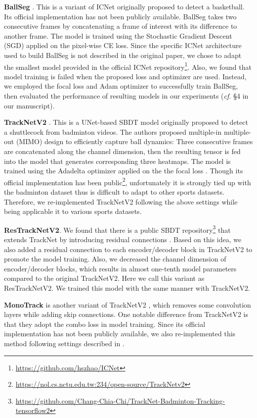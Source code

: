 \documentclass{bmvc2k}
\begin{document}
\vspace{1mm}
\noindent \textbf{BallSeg} \cite{zandycke+2019mmsports}.
This is a variant of ICNet \cite{zhao+2018eccv} originally proposed to detect a basketball.
Its official implementation has not been publicly available.
BallSeg takes two consecutive frames by concatenating a frame of interest with its difference to another frame.
The model is trained using the Stochastic Gradient Descent (SGD) applied on the pixel-wise CE loss.
Since the specific ICNet architecture used to build BallSeg is not described in the original paper, we chose to adapt the smallest model provided in the official ICNet repository\footnote{\url{https://github.com/hszhao/ICNet}}.
Also, we found that model training is failed when the proposed loss and optimizer are used.
Instead, we employed the focal loss \cite{lin+2017iccv} and Adam optimizer \cite{kingma+2015iclr} to successfully train BallSeg, then evaluated the performance of resulting models in our experiments ({\it cf.} \S 4 in our manuscript).
\par
\vspace{1mm}
\noindent \textbf{TrackNetV2} \cite{sun+2020icpai}.
This is a UNet-based \cite{ronneberger+2015miccai} SBDT model originally proposed to detect a shuttlecock from badminton videos.
The authors proposed multiple-in multiple-out (MIMO) design to efficiently capture ball dynamics:
Three consecutive frames are concatenated along the channel dimension, then the resulting tensor is fed into the model that generates corresponding three heatmaps.
The model is trained using the Adadelta \cite{zeiler2012arxiv} optimizer applied on the the focal loss \cite{lin+2017iccv}.
Though its official implementation has been public\footnote{\url{https://nol.cs.nctu.edu.tw:234/open-source/TrackNetv2}}, unfortunately it is strongly tied up with the badminton dataset thus is difficult to adapt to other sports datasets.
Therefore, we re-implemented TrackNetV2 following the above settings while being applicable it to various sports datasets.
\par
\vspace{1mm}
\noindent \textbf{ResTrackNetV2}.
We found that there is a public SBDT repository\footnote{\url{https://github.com/Chang-Chia-Chi/TrackNet-Badminton-Tracking-tensorflow2}} that extends TrackNet \cite{huang+2019avss} by introducing residual connections \cite{he+2016cvpr}.
Based on this idea, we also added a residual connection to each encoder/decoder block in TrackNetV2 \cite{sun+2020icpai} to promote the model training.
Also, we decreased the channel dimension of encoder/decoder blocks, which results in almost one-tenth model parameters compared to the original TrackNetV2.
Here we call this variant as ResTrackNetV2.
We trained this model with the same manner with TrackNetV2.
\par
\vspace{1mm}
\noindent \textbf{MonoTrack} \cite{liu+2022cvprw} is another variant of TrackNetV2 \cite{sun+2020icpai}, which removes some convolution layers while adding skip connections.
One notable difference from TrackNetV2 is that they adopt the combo loss \cite{taghanaki+cmig} in model training.
Since its official implementation has not been publicly available, we also re-implemented this method following settings described in \cite{liu+2022cvprw}.
\end{document}
